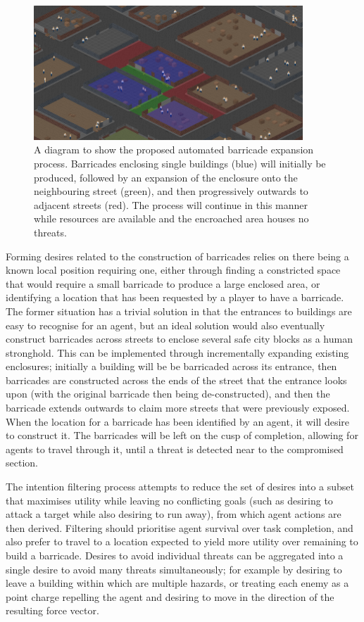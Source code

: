 \documentclass[12pt,a4paper]{article}
\begin{document}
\begin{figure}[h]
\centering
\includegraphics[width=0.9\textwidth]{barricades}
\caption{A diagram to show the proposed automated barricade expansion process. Barricades enclosing single buildings (blue) will initially be produced, followed by an expansion of the enclosure onto the neighbouring street (green), and then progressively outwards to adjacent streets (red). The process will continue in this manner while resources are available and the encroached area houses no threats.}
\label{fig:barricades}
\end{figure}

Forming desires related to the construction of barricades relies on there being a known local position requiring one, either through finding a constricted space that would require a small barricade to produce a large enclosed area, or identifying a location that has been requested by a player to have a barricade. The former situation has a trivial solution in that the entrances to buildings are easy to recognise for an agent, but an ideal solution would also eventually construct barricades across streets to enclose several safe city blocks as a human stronghold. This can be implemented through incrementally expanding existing enclosures; initially a building will be be barricaded across its entrance, then barricades are constructed across the ends of the street that the entrance looks upon (with the original barricade then being de-constructed), and then the barricade extends outwards to claim more streets that were previously exposed. When the location for a barricade has been identified by an agent, it will desire to construct it. The barricades will be left on the cusp of completion, allowing for agents to travel through it, until a threat is detected near to the compromised section.

The intention filtering process attempts to reduce the set of desires into a subset that maximises utility while leaving no conflicting goals (such as desiring to attack a target while also desiring to run away), from which agent actions are then derived. Filtering should prioritise agent survival over task completion, and also prefer to travel to a location expected to yield more utility over remaining to build a barricade. Desires to avoid individual threats can be aggregated into a single desire to avoid many threats simultaneously; for example by desiring to leave a building within which are multiple hazards, or treating each enemy as a point charge repelling the agent and desiring to move in the direction of the resulting force vector.
\end{document}
